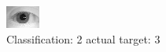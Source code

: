 \begin{figure}[h!]
\begin{center}
\includegraphics[width=0.60\columnwidth]{figures/ID1107_class_2_target_3.png}
\end{center}
\caption{ Classification: 2 actual target: 3}
\label{fig:ID1107_class_2_target_3}
\end{figure}
